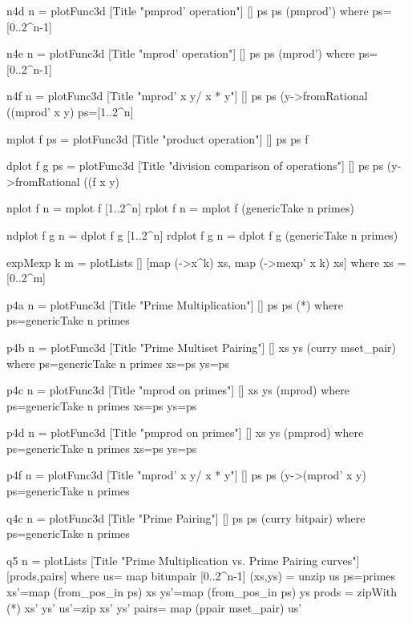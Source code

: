 \documentclass[]{INCLUDES/llncs}
\begin{document}
\begin{code}
n4d n = plotFunc3d [Title "pmprod' operation"] [] 
        ps ps (pmprod') where
          ps=[0..2^n-1]

n4e n = plotFunc3d [Title "mprod' operation"] [] 
        ps ps (mprod') where
          ps=[0..2^n-1]


n4f n = plotFunc3d [Title "mprod' x y/ x * y"] [] 
        ps ps (\x y->fromRational ((mprod' x y) %
          ps=[1..2^n]

mplot f ps = plotFunc3d [Title "product operation"] [] ps ps f
 
dplot f g ps = plotFunc3d [Title "division comparison of operations"] [] 
        ps ps (\x y->fromRational ((f x y) %

nplot f n = mplot f [1..2^n] 
rplot f n = mplot f (genericTake n primes)

ndplot f g n = dplot f g [1..2^n] 
rdplot f g n = dplot f g  (genericTake n primes)
                    
expMexp k m = plotLists []  
   [map (\x->x^k) xs, map (\x->mexp' x k) xs] where 
   xs = [0..2^m]
    
p4a n = plotFunc3d [Title "Prime Multiplication"] [] 
        ps ps (*) where
          ps=genericTake n primes

p4b n = plotFunc3d [Title "Prime Multiset Pairing"] [] 
        xs ys (curry mset_pair) where
        ps=genericTake n primes
        xs=ps
        ys=ps

p4c n = plotFunc3d [Title "mprod on primes"] [] 
        xs ys (mprod) where
        ps=genericTake n primes
        xs=ps
        ys=ps

p4d n = plotFunc3d [Title "pmprod on primes"] [] 
        xs ys (pmprod) where
        ps=genericTake n primes
        xs=ps
        ys=ps
 
 
p4f n = plotFunc3d [Title "mprod' x y/ x * y"] [] 
        ps ps (\x y->(mprod' x y) %
          ps=genericTake n primes
                         
q4c n = plotFunc3d [Title "Prime Pairing"] [] 
        ps ps (curry bitpair) where
          ps=genericTake n primes
                
q5 n = plotLists 
  [Title "Prime Multiplication vs. Prime Pairing curves"] 
  [prods,pairs] where 
    us= map bitunpair [0..2^n-1]
    (xs,ys) = unzip us  
    ps=primes
    xs'=map (from_pos_in ps) xs
    ys'=map (from_pos_in ps) ys
    prods = zipWith (*) xs' ys'
    us'=zip xs' ys'
    pairs= map (ppair mset_pair) us'


\end{code}
\end{document}
